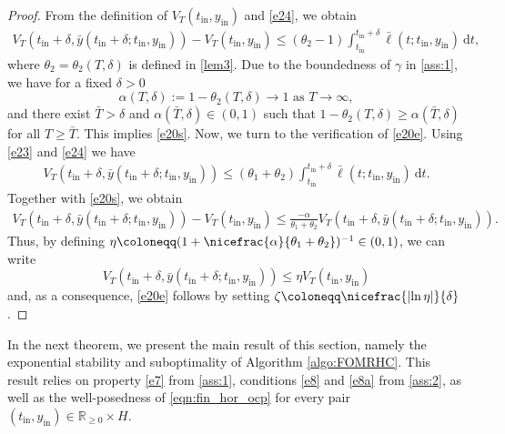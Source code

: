\documentclass{m2an}
\def\R{\mathbb{R}}
\newcommand{\dt}{\mathrm{d}t}
\newcommand{\tint}{t_{\mathrm{in}}}
\newcommand{\yint}{y_{\mathrm{in}}}
\begin{document}
\begin{proof}
    From the definition of $V_T(\tint, \yint)$ and \eqref{e24}, we obtain
    \begin{align*}
        V_T(\tint+\delta ,\bar y(\tint+\delta;\tint, \yint)) - V_T(\tint, \yint)
        \le(\theta_2-1)\int^{\tint+\delta}_{\tint}\bar \ell(t;\tint,  \yint)\ \dt,
    \end{align*}
    where $\theta_2=\theta_2(T,\delta)$ is defined in \cref{lem3}. Due to the boundedness of $\gamma$ in \cref{ass:1}, we have for a fixed $\delta>0$
    \begin{equation}
    \label{e3}
     \alpha(T,\delta) := 1-\theta_2(T,\delta) \to 1 \text{ as } T\to \infty,
    \end{equation}
    and there exist $\bar T>\delta$ and $\alpha(\bar T,\delta) \in (0,1)$ such that $1-\theta_2(T,\delta)\geq \alpha(\bar T,\delta)$ for all
    $T\geq \bar T$. This implies \eqref{e20s}.
    Now, we turn to the verification of \eqref{e20e}. Using \eqref{e23} and \eqref{e24} we have
    \begin{equation}
    \label{e44}
    \begin{split}
    V_T( \tint+\delta,\bar y( \tint+\delta; \tint, \yint)) 
                                        \leq (\theta_1+\theta_2) \int^{\tint+\delta}_{\tint} \bar \ell(t;\tint,\yint)\ \dt.
    \end{split}
    \end{equation}
    Together with  \eqref{e20s}, we obtain 
    \begin{equation*}
    \begin{split}
    V_T(\tint+\delta ,\bar y( \tint+\delta; \tint, \yint)) - V_T( \tint,  \yint)  \leq  \tfrac{-\alpha}{\theta_1+\theta_2}V_T(\tint+\delta , \bar y( \tint+\delta; \tint,  \yint)). 
    \end{split}
    \end{equation*}
    Thus, by defining $\eta\coloneqq(1+\nicefrac{\alpha}{\theta_1+\theta_2})^{-1}\in(0,1)$, we can write
    \begin{equation*}
    V_T( \tint+\delta ,\bar y( \tint+\delta; \tint, \yint)) \leq  \eta V_T(\tint,\yint)
    \end{equation*}
    and,  as a consequence,   \eqref{e20e}  follows by setting  $\zeta\coloneqq\nicefrac{\lvert  \ln\eta \lvert }{\delta}$.
\end{proof}
%
In the next theorem, we present the main result of this section, namely the exponential stability and suboptimality of Algorithm \ref{algo:FOMRHC}. This result relies on property \eqref{e7} from \cref{ass:1}, conditions \eqref{e8} and \eqref{e8a} from \cref{ass:2}, as well as the well-posedness of \eqref{eqn:fin_hor_ocp} for every pair $(\tint,\yint)\in \R_{\ge 0}\times H$.
\end{document}
